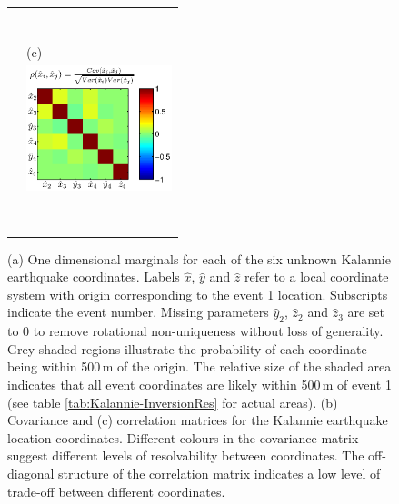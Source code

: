 \documentclass[grl]{agutex}
\begin{document}
\begin{figure}
\begin{tabular}{ll}
&  \\
 & \\
 &
 \\
\\
\\
\\
\\
& (c) \\
&
\multirow{2}{*}{\includegraphics[width=10pc]{./diags/CopiedFromThesis/Kalannie_correlation.eps}}
\\
\\
\\
\\
\\
\\
\\
\\
\\
\\
\end{tabular}
\caption{(a) One dimensional marginals for each of the six unknown Kalannie earthquake coordinates.
Labels $\hat{x}$, $\hat{y}$ and $\hat{z}$ refer to a local coordinate system with
origin corresponding to the event 1 location. Subscripts indicate the event number. Missing
parameters $\hat{y}_2$, $\hat{z}_2$ and $\hat{z}_3$ are set to 0 to remove rotational non-uniqueness without
loss of generality. Grey shaded regions illustrate the probability of each coordinate
being within 500\,m of the origin. The relative size of the shaded area
indicates that all event coordinates are likely within 500\,m of event 1
(see table \ref{tab:Kalannie-InversionRes} for actual areas). (b) Covariance and (c) correlation matrices
for the Kalannie earthquake location coordinates.
Different colours in the covariance matrix suggest different levels of resolvability between
coordinates. The off-diagonal structure of the correlation matrix indicates
a low level of trade-off between different coordinates.}
\label{fig:Kalannie-CWI-NAB-1Dmarginals}
\end{figure}
\end{document}

